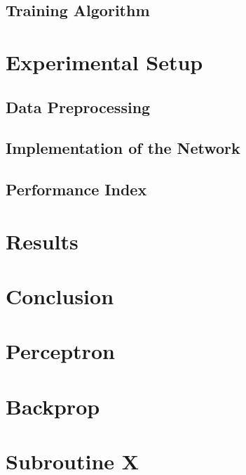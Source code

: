 \documentclass[12pt,halfline,a4paper]{ouparticle}
\begin{document}

\subsection{Training Algorithm}
\label{sec4.2}


\section{Experimental Setup}
\label{sec5}

\subsection{Data Preprocessing}
\label{sec5.1}

\subsection{Implementation of the Network}
\label{sec5.2}

\subsection{Performance Index}
\label{sec5.3}

\section{Results}
\label{sec6}

\section{Conclusion}
\label{sec7}


\pagebreak

\printbibliography[heading=bibintoc, title={References}]

\pagebreak
\appendix

\section{Perceptron}
\section{Backprop}
\section{Subroutine X}
\end{document}
